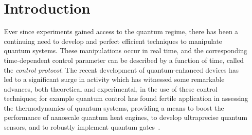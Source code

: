 \section{Introduction}\label{sec:Introduction}
Ever since experiments gained access to the quantum regime, there has been a continuing need to develop and perfect efficient techniques to manipulate quantum systems. These manipulations occur in real time, and the corresponding time-dependent control parameter can be described by a function of time, called the \textit{control protocol}. The recent development of quantum-enhanced devices has led to a significant surge in activity which has witnessed some remarkable advances, both theoretical and experimental, in the use of these control techniques; for example quantum control has found fertile application in assessing the thermodynamics of quantum systems, providing a means to boost the performance of nanoscale quantum heat engines, to develop ultraprecise quantum sensors, and to robustly implement quantum gates~\cite{Koch2022, STAreview}. 


